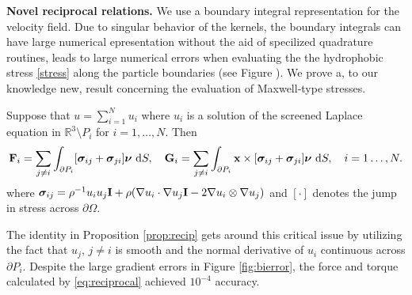 \textbf{Novel reciprocal relations.}
We use a boundary integral representation for the velocity field. Due to singular behavior of the
kernels, the boundary integrals can have large numerical epresentation without the aid of specilized
quadrature routines, leads to large numerical errors when evaluating the the hydrophobic
stress \eqref{stress} along the particle boundaries (see Figure \cite{fig:bierror}).
We prove a, to our knowledge new, result concerning the evaluation of Maxwell-type stresses. 
\begin{proposition}
  \label{prop:recip}
  Suppose that $u = \sum_{i=1}^N u_i$ where $u_i$ is a solution of the screened Laplace equation
  in $\mathbb{R}^3 \setminus P_i$ for $i=1,\dots, N.$ Then 
  \begin{equation}
    \label{eq:reciprocal}
{\bf F}_i = \sum_{j \neq i} \int_{\partial P_i}[\boldsymbol{\sigma}_{ij} + \boldsymbol{\sigma}_{ji}]\boldsymbol{\nu}\,\dif S,\quad
{\bf G}_i = \sum_{j \neq i} \int_{\partial P_i} {\bf x} \times [\boldsymbol{\sigma}_{ij} + \boldsymbol{\sigma}_{ji}]\boldsymbol{\nu}\,\dif S, \quad i = 1\dots, N.
\end{equation}
where $\boldsymbol{\sigma}_{ij} = \rho^{-1} u_iu_j {\bf I} + \rho(\nabla u_i \cdot \nabla u_j {\bf I} - 2 \nabla u_i \otimes \nabla u_j)$ and
$[\cdot]$ denotes the jump in stress across $\partial \Omega.$ 
\end{proposition}


The identity in Proposition \ref{prop:recip} gets around this critical issue by utilizing the fact that $u_j$, $j\neq i$ is smooth and the normal derivative
of  $u_i$ continuous across $\partial P_i$. Despite the large gradient errors in Figure \ref{fig:bierror}, the force and torque
calculated by \eqref{eq:reciprocal} achieved $10^{-4}$ accuracy.



